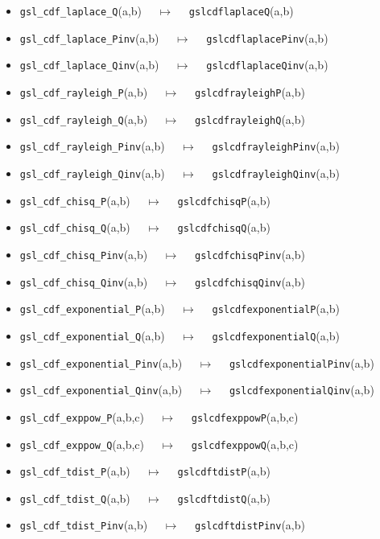 \documentclass[a4paper,twoside,12pt]{book}
\begin{document}
{\begin{itemize}
\item \texttt{gsl\_cdf\_laplace\_Q}(a,b) $\quad \mapsto\quad $ \texttt{gslcdflaplaceQ}(a,b) 
\item \texttt{gsl\_cdf\_laplace\_Pinv}(a,b) $\quad \mapsto\quad $ \texttt{gslcdflaplacePinv}(a,b) 
\item \texttt{gsl\_cdf\_laplace\_Qinv}(a,b) $\quad \mapsto\quad $ \texttt{gslcdflaplaceQinv}(a,b) 
\item \texttt{gsl\_cdf\_rayleigh\_P}(a,b) $\quad \mapsto\quad $ \texttt{gslcdfrayleighP}(a,b) 
\item \texttt{gsl\_cdf\_rayleigh\_Q}(a,b) $\quad \mapsto\quad $ \texttt{gslcdfrayleighQ}(a,b) 
\item \texttt{gsl\_cdf\_rayleigh\_Pinv}(a,b) $\quad \mapsto\quad $ \texttt{gslcdfrayleighPinv}(a,b) 
\item \texttt{gsl\_cdf\_rayleigh\_Qinv}(a,b) $\quad \mapsto\quad $ \texttt{gslcdfrayleighQinv}(a,b) 
\item \texttt{gsl\_cdf\_chisq\_P}(a,b) $\quad \mapsto\quad $ \texttt{gslcdfchisqP}(a,b) 
\item \texttt{gsl\_cdf\_chisq\_Q}(a,b) $\quad \mapsto\quad $ \texttt{gslcdfchisqQ}(a,b) 
\item \texttt{gsl\_cdf\_chisq\_Pinv}(a,b) $\quad \mapsto\quad $ \texttt{gslcdfchisqPinv}(a,b) 
\item \texttt{gsl\_cdf\_chisq\_Qinv}(a,b) $\quad \mapsto\quad $ \texttt{gslcdfchisqQinv}(a,b) 
\item \texttt{gsl\_cdf\_exponential\_P}(a,b) $\quad \mapsto\quad $ \texttt{gslcdfexponentialP}(a,b) 
\item \texttt{gsl\_cdf\_exponential\_Q}(a,b) $\quad \mapsto\quad $ \texttt{gslcdfexponentialQ}(a,b) 
\item \texttt{gsl\_cdf\_exponential\_Pinv}(a,b) $\quad \mapsto\quad $ \texttt{gslcdfexponentialPinv}(a,b) 
\item \texttt{gsl\_cdf\_exponential\_Qinv}(a,b) $\quad \mapsto\quad $ \texttt{gslcdfexponentialQinv}(a,b) 
\item \texttt{gsl\_cdf\_exppow\_P}(a,b,c) $\quad \mapsto\quad $ \texttt{gslcdfexppowP}(a,b,c) 
\item \texttt{gsl\_cdf\_exppow\_Q}(a,b,c) $\quad \mapsto\quad $ \texttt{gslcdfexppowQ}(a,b,c) 
\item \texttt{gsl\_cdf\_tdist\_P}(a,b) $\quad \mapsto\quad $ \texttt{gslcdftdistP}(a,b) 
\item \texttt{gsl\_cdf\_tdist\_Q}(a,b) $\quad \mapsto\quad $ \texttt{gslcdftdistQ}(a,b) 
\item \texttt{gsl\_cdf\_tdist\_Pinv}(a,b) $\quad \mapsto\quad $ \texttt{gslcdftdistPinv}(a,b) 

\end{itemize}}
\end{document}
